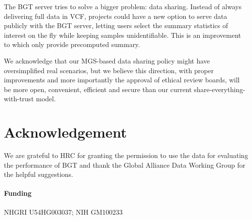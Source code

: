 \documentclass{bioinfo}
\begin{document}
The BGT server tries to solve a bigger problem: data sharing. Instead of always
delivering full data in VCF, projects could have a new option to serve data
publicly with the BGT server, letting users select the summary statistics of interest
on the fly while keeping samples unidentifiable. This is an improvement to
\citet{Stade:2014ty} which only provide precomputed summary.


We acknowledge that our MGS-based data sharing policy might have oversimplified
real scenarios, but we believe this direction, with proper improvements and
more importantly the approval of ethical review boards, will be more open,
convenient, efficient and secure than our current
share-everything-with-trust model.

\section*{Acknowledgement}
We are grateful to HRC for granting the permission to use the data for evaluating
the performance of BGT and thank the Global Alliance Data Working Group for the
helpful suggestions.
\paragraph{Funding\textcolon} NHGRI U54HG003037; NIH GM100233


\end{document}
